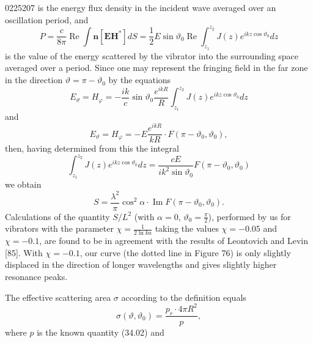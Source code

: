 \begin{scanpage}{0225}{207}
\noindent is the energy flux density in the incident wave averaged over an oscillation period, and
\[P=\frac{c}{8\pi}\operatorname{Re}\int\mathbf n[\mathbf E\mathbf H^*]dS=\frac12E\sin\vartheta_0\operatorname{Re}\int_{z_1}^{z_2}J(z)e^{ikz\cos\vartheta_0}dz\tag{34.03}\]
is the value of the energy scattered by the vibrator into the surrounding space averaged over a period. Since one may represent the fringing field in the far zone in the direction $\vartheta=\pi-\vartheta_0$ by the equations
\[E_\vartheta=H_\varphi=-\frac{ik}c\sin\vartheta_0\frac{e^{ikR}}R\int_{z_1}^{z_2}J(z)e^{ikz\cos\vartheta_0}dz\tag{34.04}\]
and
\[E_\vartheta=H_\varphi=-E\frac{e^{ikR}}{kR}\cdot F(\pi-\vartheta_0,\vartheta_0),\tag{34.05}\]
then, having determined from this the integral
\[\int_{z_1}^{z_2}J(z)e^{ikz\cos\vartheta_0}dz=\frac{cE}{ik^2\sin\vartheta_0}F(\pi-\vartheta_0,\vartheta_0)\tag{34.06}\]
we obtain
\[S=\frac{\lambda^2}\pi\cos^2\alpha\cdot\operatorname{Im}F(\pi-\vartheta_0,\vartheta_0).\tag{34.07}\]
Calculations of the quantity $S/L^2$ (with $\alpha=0$, $\vartheta_0=\frac\pi2$), performed by us for vibrators with the parameter $\chi=\frac1{2\ln ka}$ taking the values $\chi=-0.05$ and $\chi=-0.1$, are found to be in agreement with the results of Leontovich and Levin [85]. With $\chi=-0.1$, our curve (the dotted line in Figure 76) is only slightly displaced in the direction of longer wavelengths and gives slightly higher resonance peaks.

The effective scattering area $\sigma$ according to the definition equals
\[\sigma(\vartheta,\vartheta_0)=\frac{p_r\cdot4\pi R^2}{p},\tag{34.08}\]
where $p$ is the known quantity (34.02) and
\end{scanpage}
